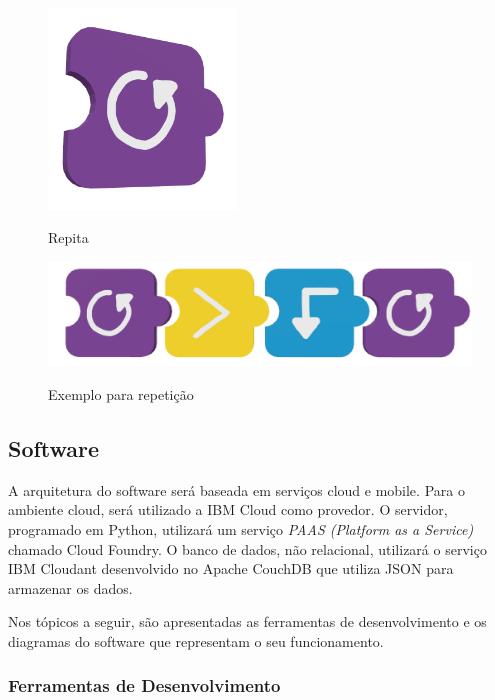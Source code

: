         \begin{figure}[H]
            \caption{Repita}
            \centering
            \includegraphics[width=5cm]{Imagens/cap3/Repita.png}
            \label{figura:repita}
        \end{figure}
        
        \begin{figure}[H]
            \caption{Exemplo para repetição}
            \centering
            \includegraphics[width=\linewidth]{Imagens/cap3/repita_exemplo.png}
            \label{figura:repita_exemplo}
        \end{figure}
    
    \subsection{Software}
    A arquitetura do software será baseada em serviços cloud e mobile. Para o ambiente cloud, será utilizado a IBM Cloud como provedor.
    O servidor, programado em Python, utilizará um serviço \textit{PAAS (Platform as a Service)} chamado Cloud Foundry. O banco de dados, não relacional, utilizará o serviço IBM Cloudant desenvolvido no Apache CouchDB que utiliza JSON para armazenar os dados.
    
    Nos tópicos a seguir, são apresentadas as ferramentas de desenvolvimento e os diagramas do software que representam o seu funcionamento.
        
        
        \subsubsection{Ferramentas de Desenvolvimento}
        
